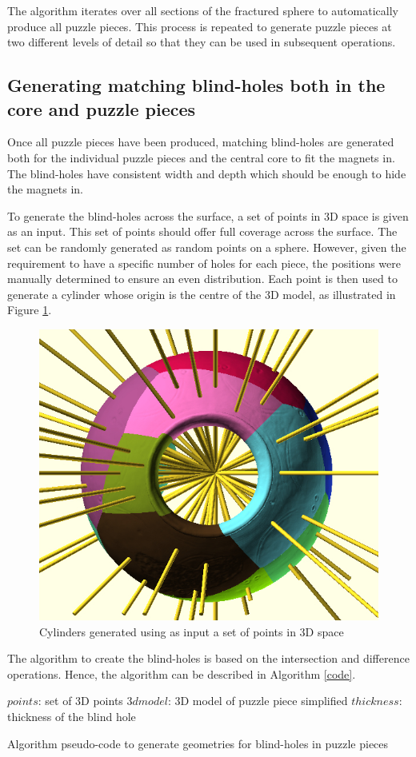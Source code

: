 \documentclass[acmlarge,screen]{acmart}
\begin{document}
The algorithm iterates over all sections of the fractured sphere to automatically produce all puzzle pieces. This process is repeated to generate puzzle pieces at two different levels of detail so that they can be used in subsequent operations.

\subsection{Generating matching blind-holes both in the core and puzzle pieces}
Once all puzzle pieces have been produced, matching blind-holes are generated both for the individual puzzle pieces and the central core to fit the magnets in. The blind-holes have consistent width and depth which should be enough to hide the magnets in. 

To generate the blind-holes across the surface, a set of points in 3D space is given as an input. This set of points should offer full coverage across the surface. The set can be randomly generated as random points on a sphere. However, given the requirement to have a specific number of holes for each piece, the positions were manually determined to ensure an even distribution. Each point is then used to generate a cylinder whose origin is the centre of the 3D model, as illustrated in Figure \ref{fig:cylinders}.

\begin{figure}[h]
  \centering
  \includegraphics[width=0.6\linewidth]{images/allcylinders.jpg}
  \caption{\label{fig:cylinders}
    Cylinders generated using as input a set of points in 3D space}
\end{figure}

The algorithm to create the blind-holes is based on the intersection and difference operations. Hence, the algorithm can be described in Algorithm \ref{code}.

\begin{algorithm}
   $points$: set of 3D points\;
   $3dmodel$: 3D model of puzzle piece simplified\;
   $thickness$: thickness of the blind hole\;
\caption{\label{code}Algorithm pseudo-code to generate geometries for blind-holes in puzzle pieces}
\end{algorithm}
\end{document}

